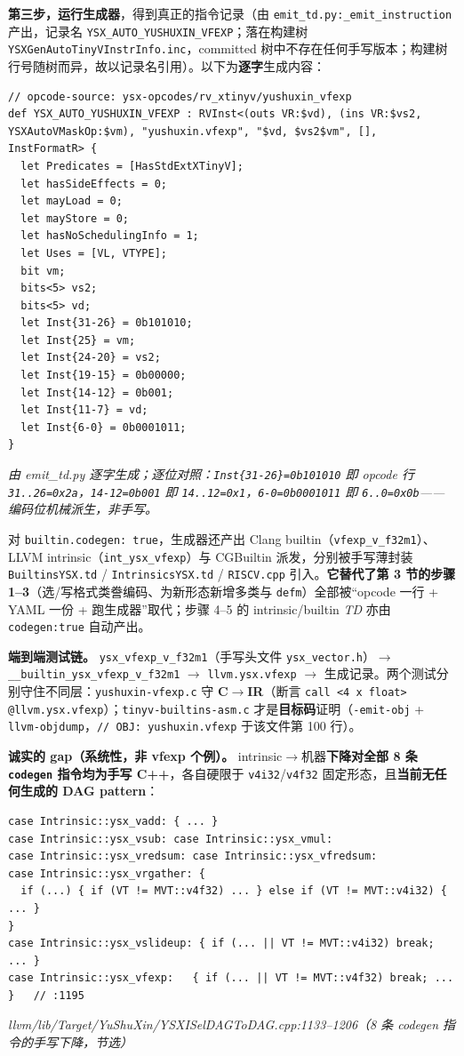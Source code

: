 \documentclass[11pt,UTF8,fontset=none]{ctexart}
\newcommand{\fcite}[1]{{\footnotesize\itshape\textcolor{framegray}{#1}}}
\begin{document}
\textbf{第三步，运行生成器}，得到真正的指令记录（由 \texttt{emit\_td.py:\_emit\_instruction} 产出，记录名 \texttt{YSX\_AUTO\_YUSHUXIN\_VFEXP}；落在构建树 \texttt{YSXGenAutoTinyVInstrInfo.inc}，committed 树中不存在任何手写版本；构建树行号随树而异，故以记录名引用）。以下为\textbf{逐字}生成内容：
\begin{lstlisting}
// opcode-source: ysx-opcodes/rv_xtinyv/yushuxin_vfexp
def YSX_AUTO_YUSHUXIN_VFEXP : RVInst<(outs VR:$vd), (ins VR:$vs2, YSXAutoVMaskOp:$vm), "yushuxin.vfexp", "$vd, $vs2$vm", [], InstFormatR> {
  let Predicates = [HasStdExtXTinyV];
  let hasSideEffects = 0;
  let mayLoad = 0;
  let mayStore = 0;
  let hasNoSchedulingInfo = 1;
  let Uses = [VL, VTYPE];
  bit vm;
  bits<5> vs2;
  bits<5> vd;
  let Inst{31-26} = 0b101010;
  let Inst{25} = vm;
  let Inst{24-20} = vs2;
  let Inst{19-15} = 0b00000;
  let Inst{14-12} = 0b001;
  let Inst{11-7} = vd;
  let Inst{6-0} = 0b0001011;
}
\end{lstlisting}
\fcite{由 emit\_td.py 逐字生成；逐位对照：\texttt{Inst\{31-26\}=0b101010} 即 opcode 行 \texttt{31..26=0x2a}，\texttt{14-12=0b001} 即 \texttt{14..12=0x1}，\texttt{6-0=0b0001011} 即 \texttt{6..0=0x0b}——编码位机械派生，非手写。}

对 \texttt{builtin.codegen:\ true}，生成器还产出 Clang builtin（\texttt{vfexp\_v\_f32m1}）、LLVM intrinsic（\texttt{int\_ysx\_vfexp}）与 CGBuiltin 派发，分别被手写薄封装 \texttt{BuiltinsYSX.td} / \texttt{IntrinsicsYSX.td} / \texttt{RISCV.cpp} 引入。\textbf{它替代了第 3 节的步骤 1–3}（选/写格式类誊编码、为新形态新增多类与 \texttt{defm}）全部被“opcode 一行 + YAML 一份 + 跑生成器”取代；步骤 4–5 的 intrinsic/builtin \emph{TD} 亦由 \texttt{codegen:true} 自动产出。

\textbf{端到端测试链。} \texttt{ysx\_vfexp\_v\_f32m1}（手写头文件 \texttt{ysx\_vector.h}）$\to$ \texttt{\_\_builtin\_ysx\_vfexp\_v\_f32m1} $\to$ \texttt{llvm.ysx.vfexp} $\to$ 生成记录。两个测试分别守住不同层：\texttt{yushuxin-vfexp.c} 守 \textbf{C$\to$IR}（断言 \texttt{call <4 x float> @llvm.ysx.vfexp}）；\texttt{tinyv-builtins-asm.c} 才是\textbf{目标码}证明（\texttt{-emit-obj} + \texttt{llvm-objdump}，\texttt{// OBJ:\ yushuxin.vfexp} 于该文件第 100 行）。

\textbf{诚实的 gap（系统性，非 vfexp 个例）。} intrinsic$\to$机器\textbf{下降对全部 8 条 \texttt{codegen} 指令均为手写 C++}，各自硬限于 \texttt{v4i32}/\texttt{v4f32} 固定形态，且\textbf{当前无任何生成的 DAG pattern}：
\begin{lstlisting}
case Intrinsic::ysx_vadd: { ... }
case Intrinsic::ysx_vsub: case Intrinsic::ysx_vmul:
case Intrinsic::ysx_vredsum: case Intrinsic::ysx_vfredsum:
case Intrinsic::ysx_vrgather: {
  if (...) { if (VT != MVT::v4f32) ... } else if (VT != MVT::v4i32) { ... }
}
case Intrinsic::ysx_vslideup: { if (... || VT != MVT::v4i32) break; ... }
case Intrinsic::ysx_vfexp:   { if (... || VT != MVT::v4f32) break; ... }   // :1195
\end{lstlisting}
\fcite{llvm/lib/Target/YuShuXin/YSXISelDAGToDAG.cpp:1133--1206（8 条 codegen 指令的手写下降，节选）}
\end{document}
